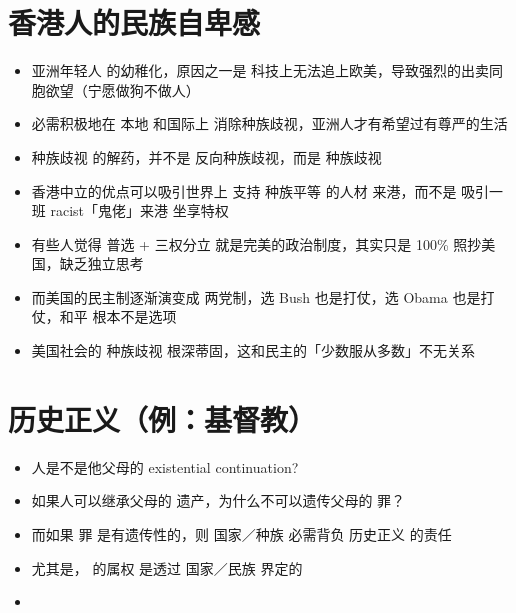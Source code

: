\section{香港人的民族自卑感}
\begin{itemize}
	\item 亚洲年轻人 的幼稚化，原因之一是 科技上无法追上欧美，导致强烈的出卖同胞欲望（宁愿做狗不做人）
	

	\item 必需积极地在 本地 和国际上 消除种族歧视，亚洲人才有希望过有尊严的生活

	\item 种族歧视 的解药，并不是 反向种族歧视，而是 种族歧视
	
	\item 香港中立的优点可以吸引世界上 支持 种族平等 的人材 来港，而不是 吸引一班 racist「鬼佬」来港 坐享特权

	\item 有些人觉得 普选 + 三权分立 就是完美的政治制度，其实只是 100\% 照抄美国，缺乏独立思考
	
	\item 而美国的民主制逐渐演变成 两党制，选 Bush 也是打仗，选 Obama 也是打仗，和平 根本不是选项
	
	\item 美国社会的 种族歧视 根深蒂固，这和民主的「少数服从多数」不无关系
\end{itemize}



\section{历史正义（例：基督教）}
\begin{itemize}
	\item 人是不是他父母的 existential continuation?
	
	\item 如果人可以继承父母的 遗产，为什么不可以遗传父母的 罪？
	
	\item 而如果 罪 是有遗传性的，则 国家／种族 必需背负 历史正义 的责任
	
	\item 尤其是， 的属权 是透过 国家／民族 界定的
	
	\item 
\end{itemize}



